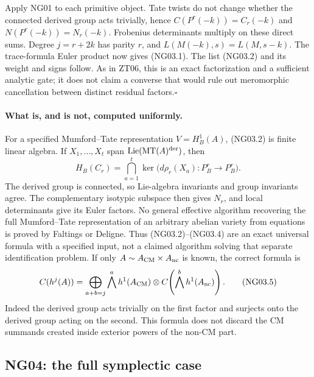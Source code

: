 \documentclass[11pt]{article}
\theoremstyle{remark}
\begin{document}
Apply NG01 to each primitive object.  Tate twists do not change
whether the connected derived group acts trivially, hence
$C(P^r(-k))=C_r(-k)$ and $N(P^r(-k))=N_r(-k)$.  Frobenius determinants
multiply on these direct sums.  Degree $j=r+2k$ has parity $r$, and
$L(M(-k),s)=L(M,s-k)$.  The trace-formula Euler product now gives
(NG03.1).  The list (NG03.2) and its weight and signs follow.  As in
ZT06, this is an exact factorization and a sufficient analytic gate;
it does not claim a converse that would rule out meromorphic
cancellation between distinct residual factors.\hfill$\square$

\paragraph{What is, and is not, computed uniformly.}
For a specified Mumford--Tate representation $V=H^1_B(A)$, (NG03.2)
is finite linear algebra.  If $X_1,\ldots,X_t$ span
$\operatorname{Lie}(\operatorname{MT}(A)^{\rm der})$, then
\[
             H_B(C_r)=\bigcap_{a=1}^t
                  \ker\bigl(d\rho_r(X_a):P^r_B\to P^r_B\bigr).
                                                                    \tag{NG03.4}
\]
The derived group is connected, so Lie-algebra invariants and group
invariants agree.  The complementary isotypic subspace then gives
$N_r$, and local determinants give its Euler factors.  No general
effective algorithm recovering the full Mumford--Tate representation
of an arbitrary abelian variety from equations is proved by
Faltings or Deligne.  Thus (NG03.2)--(NG03.4) are an exact universal
formula with a specified input, not a claimed algorithm solving that
separate identification problem.  If only $A\sim A_{\rm CM}\times
A_{\rm nc}$ is known, the correct formula is
\[
 C(h^j(A))=
 \bigoplus_{a+b=j}\bigwedge^a h^1(A_{\rm CM})\otimes
                       C\!\left(\bigwedge^b h^1(A_{\rm nc})\right).
                                                                    \tag{NG03.5}
\]
Indeed the derived group acts trivially on the first factor and
surjects onto the derived group acting on the second.  This formula
does not discard the CM summands created inside exterior powers of
the non-CM part.

\subsection{NG04: the full symplectic case}
\label{NG04}
\end{document}
